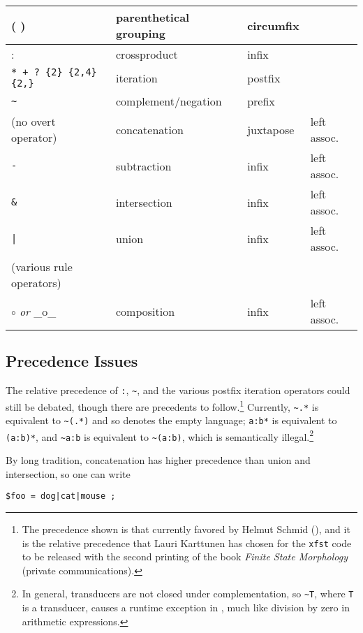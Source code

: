 \noindent
\begin{tabular}{|l|l|l|l|}
\hline
( ) &  parenthetical grouping & circumfix &\\
\hline
: & crossproduct & infix &\\
\hline
\verb!* + ? {2} {2,4} {2,}! & iteration & postfix &\\
\hline
\verb!~!  & complement/negation & prefix & \\
\hline
(no overt operator) & concatenation & juxtapose & left assoc.\\
\hline
\verb!-! & subtraction  & infix & left assoc.\\
\hline
\verb!&! & intersection & infix & left assoc.\\
\hline
\verb!|! & union        & infix & left assoc.\\
\hline
(various rule operators) & & &\\
\hline
$\circ$ \emph{or} \_o\_  & composition & infix & left assoc.\\
\hline
\end{tabular}

\vspace{0.5cm}

\subsection{Precedence Issues}
 
The relative precedence of  \verb!:!, \verb!~!, and the various postfix
iteration operators could still be debated, though
there are precedents to follow.\footnote{The precedence shown is
that currently favored by Helmut Schmid (), and it is the relative precedence that Lauri Karttunen
has chosen for the  \texttt{xfst} code to be released with the second printing of
the book \emph{Finite State Morphology} (private communications).}
Currently, \verb!~.*! is
equivalent to \verb!~(.*)! and so denotes the empty language; \verb!a:b*!
is equivalent to \verb!(a:b)*!, and \verb!~a:b! is equivalent to
\verb!~(a:b)!, which is semantically illegal.\footnote{In general, transducers are not closed under
complementation, so \texttt{\~{}T}, where \texttt{T} is a transducer, causes a
runtime exception in \Kleene{}, much like division by zero in
arithmetic expressions.}

By long tradition, concatenation has higher precedence
than union and intersection, so one can write  

\begin{Verbatim}
$foo = dog|cat|mouse ; 
\end{Verbatim}

